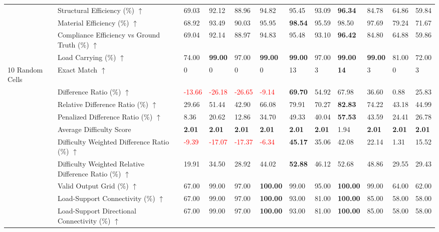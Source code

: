 \begin{table}[!h]
{\begin{tabular}{llllllllllll}
 & Structural Efficiency (\%) $\uparrow$ & 69.03 & 92.12 & 88.96 & 94.82 & 95.45 & 93.09 & \textbf{96.34} & 84.78 & 64.86 & 59.84 \\
 & Material Efficiency (\%) $\uparrow$ & 68.92 & 93.49 & 90.03 & 95.95 & \textbf{98.54} & 95.59 & 98.50 & 97.69 & 79.24 & 71.67 \\
 & Compliance Efficiency vs Ground Truth (\%) $\uparrow$ & 69.04 & 92.14 & 88.97 & 94.83 & 95.48 & 93.10 & \textbf{96.42} & 84.80 & 64.88 & 59.86 \\
 & Load Carrying (\%) $\uparrow$ & 74.00 & \textbf{99.00} & 97.00 & \textbf{99.00} & \textbf{99.00} & 97.00 & \textbf{99.00} & \textbf{99.00} & 81.00 & 72.00 \\
10 Random Cells & Exact Match $\uparrow$ & 0 & 0 & 0 & 0 & 13 & 3 & \textbf{14} & 3 & 0 & 3 \\
 & Difference Ratio (\%) $\uparrow$ & \textcolor{red}{-13.66} & \textcolor{red}{-26.18} & \textcolor{red}{-26.65} & \textcolor{red}{-9.14} & \textbf{69.70} & 54.92 & 67.98 & 36.60 & 0.88 & 25.83 \\
 & Relative Difference Ratio (\%) $\uparrow$ & 29.66 & 51.44 & 42.90 & 66.08 & 79.91 & 70.27 & \textbf{82.83} & 74.22 & 43.18 & 44.99 \\
 & Penalized Difference Ratio (\%) $\uparrow$ & 8.36 & 20.62 & 12.86 & 34.70 & 49.33 & 40.04 & \textbf{57.53} & 43.59 & 24.41 & 26.78 \\
 & Average Difficulty Score & \textbf{2.01} & \textbf{2.01} & \textbf{2.01} & \textbf{2.01} & \textbf{2.01} & \textbf{2.01} & 1.94 & \textbf{2.01} & \textbf{2.01} & \textbf{2.01} \\
 & Difficulty Weighted Difference Ratio (\%) $\uparrow$ & \textcolor{red}{-9.39} & \textcolor{red}{-17.07} & \textcolor{red}{-17.37} & \textcolor{red}{-6.34} & \textbf{45.17} & 35.06 & 42.08 & 22.14 & 1.31 & 15.52 \\
 & Difficulty Weighted Relative Difference Ratio (\%) $\uparrow$ & 19.91 & 34.50 & 28.92 & 44.02 & \textbf{52.88} & 46.12 & 52.68 & 48.86 & 29.55 & 29.43 \\
 & Valid Output Grid (\%) $\uparrow$ & 67.00 & 99.00 & 97.00 & \textbf{100.00} & 99.00 & 95.00 & \textbf{100.00} & 99.00 & 64.00 & 62.00 \\
 & Load-Support Connectivity (\%) $\uparrow$ & 67.00 & 99.00 & 97.00 & \textbf{100.00} & 93.00 & 81.00 & \textbf{100.00} & 85.00 & 58.00 & 58.00 \\
 & Load-Support Directional Connectivity (\%) $\uparrow$ & 67.00 & 99.00 & 97.00 & \textbf{100.00} & 93.00 & 81.00 & \textbf{100.00} & 85.00 & 58.00 & 58.00 \\

\end{tabular}}
\end{table}
